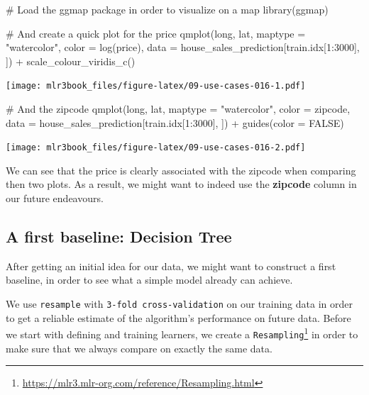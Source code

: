 \documentclass[12pt,]{scrbook}
\newenvironment{Shaded}{}{}
\newcommand{\CommentTok}[1]{\textcolor[rgb]{0.00,0.50,0.00}{#1}}
\newcommand{\DataTypeTok}[1]{#1}
\newcommand{\DecValTok}[1]{#1}
\newcommand{\KeywordTok}[1]{\textcolor[rgb]{0.00,0.00,1.00}{#1}}
\newcommand{\NormalTok}[1]{#1}
\newcommand{\OperatorTok}[1]{#1}
\newcommand{\OtherTok}[1]{\textcolor[rgb]{1.00,0.25,0.00}{#1}}
\newcommand{\StringTok}[1]{\textcolor[rgb]{0.00,0.50,0.50}{#1}}
\renewcommand{\href}[2]{#2\footnote{\url{#1}}}
\begin{document}
\begin{Shaded}
\begin{Highlighting}[]
\CommentTok{# Load the ggmap package in order to visualize on a map}
\KeywordTok{library}\NormalTok{(ggmap)}

\CommentTok{# And create a quick plot for the price}
\KeywordTok{qmplot}\NormalTok{(long, lat, }\DataTypeTok{maptype =} \StringTok{"watercolor"}\NormalTok{, }\DataTypeTok{color =} \KeywordTok{log}\NormalTok{(price), }
  \DataTypeTok{data =}\NormalTok{ house_sales_prediction[train.idx[}\DecValTok{1}\OperatorTok{:}\DecValTok{3000}\NormalTok{], ]) }\OperatorTok{+}\StringTok{ }
\StringTok{  }\KeywordTok{scale_colour_viridis_c}\NormalTok{()}
\end{Highlighting}
\end{Shaded}

\texttt{[image: mlr3book\_files/figure-latex/09-use-cases-016-1.pdf]}

\begin{Shaded}
\begin{Highlighting}[]

\CommentTok{# And the zipcode}
\KeywordTok{qmplot}\NormalTok{(long, lat, }\DataTypeTok{maptype =} \StringTok{"watercolor"}\NormalTok{, }\DataTypeTok{color =}\NormalTok{ zipcode, }
  \DataTypeTok{data =}\NormalTok{ house_sales_prediction[train.idx[}\DecValTok{1}\OperatorTok{:}\DecValTok{3000}\NormalTok{], ]) }\OperatorTok{+}\StringTok{ }
\StringTok{  }\KeywordTok{guides}\NormalTok{(}\DataTypeTok{color =} \OtherTok{FALSE}\NormalTok{)}
\end{Highlighting}
\end{Shaded}

\texttt{[image: mlr3book\_files/figure-latex/09-use-cases-016-2.pdf]}

We can see that the price is clearly associated with the zipcode when comparing then two plots.
As a result, we might want to indeed use the \textbf{zipcode} column in our future endeavours.

\hypertarget{a-first-baseline-decision-tree}{%
\subsection{A first baseline: Decision Tree}\label{a-first-baseline-decision-tree}}

After getting an initial idea for our data, we might want to construct a first baseline, in order to see what a simple model already can achieve.

We use \texttt{resample} with \texttt{3-fold\ cross-validation} on our training data in order to get a reliable estimate of the algorithm's performance on future data.
Before we start with defining and training learners, we create a \href{https://mlr3.mlr-org.com/reference/Resampling.html}{\texttt{Resampling}} in order to make sure that we always compare on exactly the same data.
\end{document}
